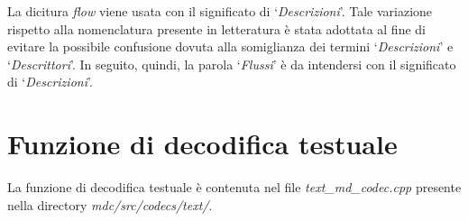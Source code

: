 \begin{notabene}
La dicitura \textit{flow} viene usata con il significato di
`\emph{Descrizioni}'. Tale variazione rispetto alla nomenclatura presente in
letteratura è stata adottata al fine di evitare la possibile confusione dovuta
alla somiglianza dei termini `\emph{Descrizioni}' e `\emph{Descrittori}'. In seguito, quindi, la parola `\emph{Flussi}' è da intendersi con il significato di `\emph{Descrizioni}'.
\end{notabene}

\section{Funzione di decodifica testuale}

La funzione di decodifica testuale è contenuta nel file
\textit{text\_md\_codec.cpp} presente nella directory \textit{mdc/src/codecs/text/}.

